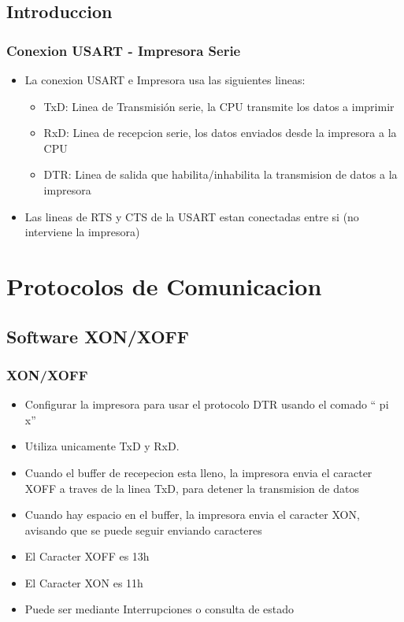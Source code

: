 \documentclass{beamer}
\begin{document}
\subsection{Introduccion}
\begin{frame}[fragile]
\frametitle{Conexion USART - Impresora Serie}
\begin{itemize}
 \item La conexion USART e Impresora usa las siguientes lineas:
 \begin{itemize}
  \item TxD: Linea de Transmisión serie, la CPU transmite los datos a imprimir
  \item RxD: Linea de recepcion serie, los datos enviados desde la impresora a la CPU
  \item DTR: Linea de salida que habilita/inhabilita la transmision de datos a la impresora
\end{itemize}
\item Las lineas de RTS y CTS de la USART estan conectadas entre si (no interviene la impresora)
\end{itemize}
\end{frame}

\section{Protocolos de Comunicacion}
\subsection{Software XON/XOFF}
\begin{frame}[fragile]
\frametitle{XON/XOFF}
\begin{itemize}
 \item Configurar la impresora para usar el protocolo DTR usando el comado `` pi x''
 \item Utiliza unicamente TxD y RxD.
 \item Cuando el buffer de recepecion esta lleno, la impresora envia el caracter XOFF a traves de la linea TxD, para detener la transmision de datos
 \item Cuando hay espacio en el buffer, la impresora envia el caracter XON, avisando que se puede seguir enviando caracteres
 \item El Caracter XOFF es 13h
 \item El Caracter XON es 11h
 \item Puede ser mediante Interrupciones o consulta de estado
\end{itemize}

\end{frame}
\end{document}
